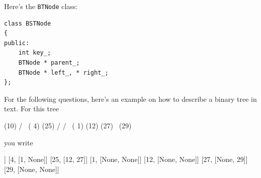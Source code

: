 

Here's the \verb!BTNode! class:
\begin{Verbatim}[frame=single,fontsize=\footnotesize]
class BSTNode
{
public:
    int key_;
    BTNode * parent_;
    BTNode * left_, * right_;
};
\end{Verbatim}

For the following questions,
here's an example on how to describe a binary tree in text.
For this tree
\begin{console}[fontsize=\footnotesize]
            (10)
          /      \
      ( 4)        (25)
     /           /    \
 ( 1)        (12)      (27)
                           \
                            (29)
\end{console}
you write
\begin{console}[fontsize=\footnotesize]
[10, [4, 25]]
[4, [1, None]]
[25, [12, 27]]
[1, [None, None]]
[12, [None, None]]
[27, [None, 29]]
[29, [None, None]]
\end{console}

